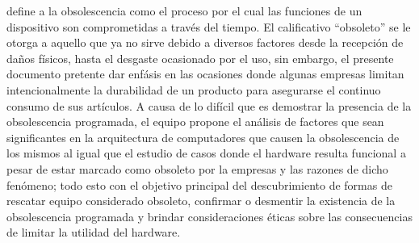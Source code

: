 \documentclass[10pt,journal,compsoc]{IEEEtran}
\begin{document}
% 
% 
% 
% 
  define a la obsolescencia como el proceso por el cual las funciones de un dispositivo son
comprometidas a través del tiempo. El calificativo “obsoleto” se le otorga a aquello que ya no sirve
debido a diversos factores desde la recepción de daños físicos, hasta el desgaste ocasionado por el
uso, sin embargo, el presente documento pretente dar enfásis en las ocasiones donde algunas empresas limitan intencionalmente la durabilidad de un producto para asegurarse el continuo consumo de sus artículos.
A causa de lo difícil que es demostrar la presencia de la obsolescencia programada, el equipo
propone el análisis de factores que sean significantes en la arquitectura de computadores que
causen la obsolescencia de los mismos al igual que el estudio de casos donde el hardware resulta
funcional a pesar de estar marcado como obsoleto por la empresas y las razones de dicho fenómeno;
todo esto con el objetivo principal del descubrimiento de formas de rescatar equipo considerado
obsoleto, confirmar o desmentir la existencia de la obsolescencia programada y brindar
consideraciones éticas sobre las consecuencias de limitar la utilidad del hardware.
\end{document}

